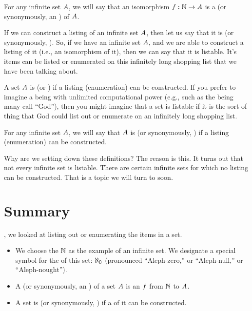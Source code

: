 \documentclass[../../../main.tex]{subfiles}
\begin{document}
\begin{fdefinition}[Listings]
  \label{def:listings}
  For any infinite set $A$, we will say that an isomorphism $\funcsig{f}{\Nats/}{\set{A}}$ is a  (or synonymously, an ) of $A$.
\end{fdefinition}

If we can construct a listing of an infinite set $A$, then let us say that it is  (or synonymously, ). So, if we have an infinite set $A$, and we are able to construct a listing of it (i.e., an isomorphism of it), then we can say that it is listable. It's items can be listed or enumerated on this infinitely long shopping list that we have been talking about.

\begin{terminology}
  A set $A$ is  (or ) if a listing (enumeration) can be constructed. If you prefer to imagine a being with unlimited computational power (e.g., such as the being many call ``God''), then you might imagine that a set is listable if it is the sort of thing that God could list out or enumerate on an infinitely long shopping list.
\end{terminology}

\begin{fdefinition}[Listability]
  \label{def:listability}
  For any infinite set $A$, we will say that $A$ is  (or synonymously, ) if a listing (enumeration) can be constructed.

\end{fdefinition}

Why are we setting down these definitions? The reason is this. It turns out that not every infinite set is listable. There are certain infinite sets for which no listing can be constructed. That is a topic we will turn to soon.


\section{Summary}

, we looked at listing out or enumerating the items in a set. 

\begin{itemize}

  \item We choose the  $\Nats/$ as the  example of an infinite set. We designate a special symbol for the  of this set: $\AlephZero/$ (pronounced ``Aleph-zero,'' or ``Aleph-null,'' or ``Aleph-nought''). 

  \item A  (or synonymously, an ) of a set $A$ is an  $f$ from $\Nats/$ to $A$.
  
  \item A set is  (or synonymously, ) if a  of it can be constructed.

\end{itemize}
\end{document}
